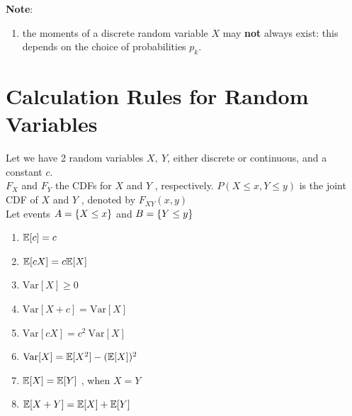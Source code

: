 \vspace{0.5cm}
\textbf{Note}:
\begin{enumerate}
    \item the moments of a discrete random variable $X$ may \textbf{not} always exist: this depends on the choice of probabilities $p _k $.
    \hfill \cite{statistics/book/Statistics-for-Data-Scientists/Maurits-Kaptein}
\end{enumerate}


\section{Calculation Rules for Random Variables}

Let we have 2 random variables $X, \ Y$, either discrete or continuous, and a constant $c$.
\\
$F _X$ and $F_Y$ the CDFs for $X$ and $Y$ , respectively. $P(X \leq x, Y \leq y)$ is the joint CDF
of $X$ and $Y$ , denoted by $F _{X Y} (x, y)$
\\
Let events $A = \left\{X \leq x\right\}$ and $B = \left\{Y \leq y\right\}$

\begin{multicols}{2}
\begin{enumerate}[series=calcrulesrv]
    \item $\mathbb{E}[c] = c$
    \hfill \cite{statistics/book/Statistics-for-Data-Scientists/Maurits-Kaptein}

    \item $\mathbb{E}[cX] = c \mathbb{E}[X]$
    \hfill \cite{statistics/book/Statistics-for-Data-Scientists/Maurits-Kaptein}

    \item $\text{Var}[X] \geq 0$
    \hfill \cite{statistics/book/Statistics-for-Data-Scientists/Maurits-Kaptein}

    \item $\text{Var}[X + c] = \text{Var}[X]$
    \hfill \cite{statistics/book/Statistics-for-Data-Scientists/Maurits-Kaptein}

    \item $\text{Var}[cX] = c^2\ \text{Var}[X]$
    \hfill \cite{statistics/book/Statistics-for-Data-Scientists/Maurits-Kaptein}

    \item $\text{Var}[X] = \mathbb{E}[X^2] - (\mathbb{E}[X])^2$
    \hfill \cite{statistics/book/Statistics-for-Data-Scientists/Maurits-Kaptein}

    \item $\mathbb{E}[X] = \mathbb{E}[Y]$ , when $X = Y$
    \hfill \cite{statistics/book/Statistics-for-Data-Scientists/Maurits-Kaptein}

    \item $\mathbb{E}[X + Y] = \mathbb{E}[X] + \mathbb{E}[Y]$
    \hfill \cite{statistics/book/Statistics-for-Data-Scientists/Maurits-Kaptein}
\end{enumerate}
\end{multicols}

